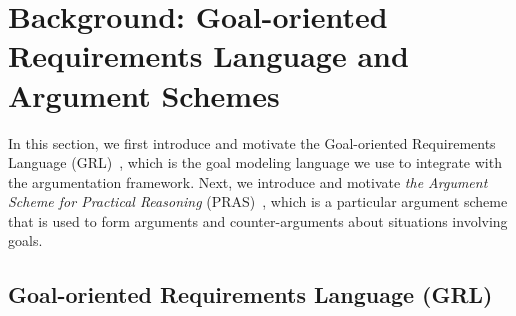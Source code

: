 \section{Background: Goal-oriented Requirements Language and Argument Schemes}
\label{sect:background}

In this section, we first introduce and motivate the Goal-oriented Requirements Language (GRL)~\cite{Amyot:2010:EGM:1841349.1841356}, which is the goal modeling language we use to integrate with the argumentation framework. Next, we introduce and motivate \emph{the Argument Scheme for Practical Reasoning} (PRAS)~\cite{}, which is a particular argument scheme that is used to form arguments and counter-arguments about situations involving goals.

\subsection{Goal-oriented Requirements Language (GRL)}
\label{sect:background:grl}
